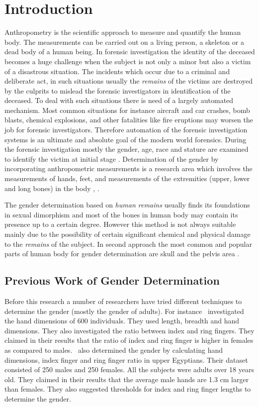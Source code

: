 \documentclass{bioinfo}
\begin{document}
\section{Introduction}

Anthropometry is the scientific approach to measure and quantify the human body. The measurements can be carried out on a living person, a skeleton or a dead body of a human being. In forensic investigation the identity of the deceased becomes a huge challenge when the subject is not only a minor but also a victim of a disastrous situation. The incidents which occur due to a criminal and deliberate act, in such situations usually the \textit{remains} of the victims are destroyed by the culprits to mislead the forensic investigators in identification of the deceased. To deal with such situations there is need of a largely automated mechanism. Most common situations for instance aircraft and car crashes, bomb blasts, chemical explosions, and other fatalities like fire eruptions may worsen the job for forensic investigators. Therefore automation of the forensic investigation systems is an ultimate and absolute goal of the modern world forensics. During the forensic investigation mostly the gender, age, race and stature are examined to identify the victim at initial stage \citep{david17}. Determination of the gender by incorporating anthropometric measurements is a research area which involves the measurements of hands, feet, and measurements of the extremities (upper, lower and long bones) in the body \citep{aboulh11}, \citep{ibrahim16}. 

The gender determination based on \textit{human remains} usually finds its foundations in sexual dimorphism and most of the bones in human body may contain its presence up to a certain degree. However this method is not always suitable mainly due to the possibility of certain significant chemical and physical damage to the \textit{remains} of the subject. In second approach the most common and popular parts of human body for gender determination are skull and the pelvis area \citep{scdpin16}. 

\subsection{Previous Work of Gender Determination}
Before this research a number of researchers have tried different techniques to determine the gender (mostly the gender of adults). For instance~\citep{ibrahim16} investigated the hand dimensions of 600 individuals. They used length, breadth and hand dimensions. They also investigated the ratio between index and ring fingers. They claimed in their results that the ratio of index and ring finger is higher in females as compared to males.~\citep{aboulh11} also determined the gender by calculating hand dimensions, index finger and ring finger ratio in upper Egyptians. Their dataset consisted of 250 males and 250 females. All the subjects were adults over 18 years old. They claimed in their results that the average male hands are 1.3 cm larger than females. They also suggested thresholds for index and ring finger lengths to determine the gender.
\end{document}

